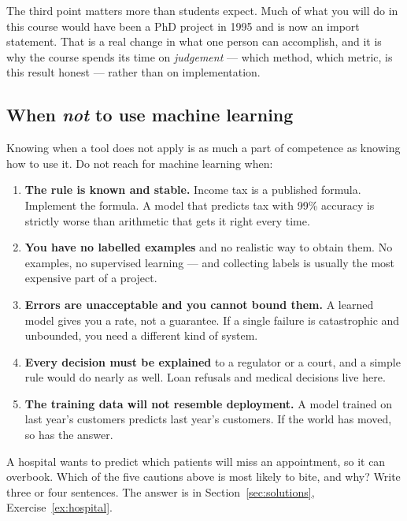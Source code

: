 \documentclass[11pt]{article}
\begin{document}
The third point matters more than students expect. Much of what you will do in
this course would have been a PhD project in 1995 and is now an import
statement. That is a real change in what one person can accomplish, and it is
why the course spends its time on \emph{judgement} --- which method, which
metric, is this result honest --- rather than on implementation.

\subsection{When \emph{not} to use machine learning}
\label{sec:cautions}

Knowing when a tool does not apply is as much a part of competence as knowing
how to use it. Do not reach for machine learning when:

\begin{enumerate}[leftmargin=*]
  \item \textbf{The rule is known and stable.} Income tax is a published
    formula. Implement the formula. A model that predicts tax with 99\% accuracy
    is strictly worse than arithmetic that gets it right every time.
  \item \textbf{You have no labelled examples} and no realistic way to obtain
    them. No examples, no supervised learning --- and collecting labels is
    usually the most expensive part of a project.
  \item \textbf{Errors are unacceptable and you cannot bound them.} A learned
    model gives you a rate, not a guarantee. If a single failure is
    catastrophic and unbounded, you need a different kind of system.
  \item \textbf{Every decision must be explained} to a regulator or a court, and
    a simple rule would do nearly as well. Loan refusals and medical decisions
    live here.
  \item \textbf{The training data will not resemble deployment.} A model trained
    on last year's customers predicts last year's customers. If the world has
    moved, so has the answer.
\end{enumerate}

\begin{tryit}
A hospital wants to predict which patients will miss an appointment, so it can
overbook. Which of the five cautions above is most likely to bite, and why?
Write three or four sentences. The answer is in Section~\ref{sec:solutions},
Exercise~\ref{ex:hospital}.
\end{tryit}
\end{document}
